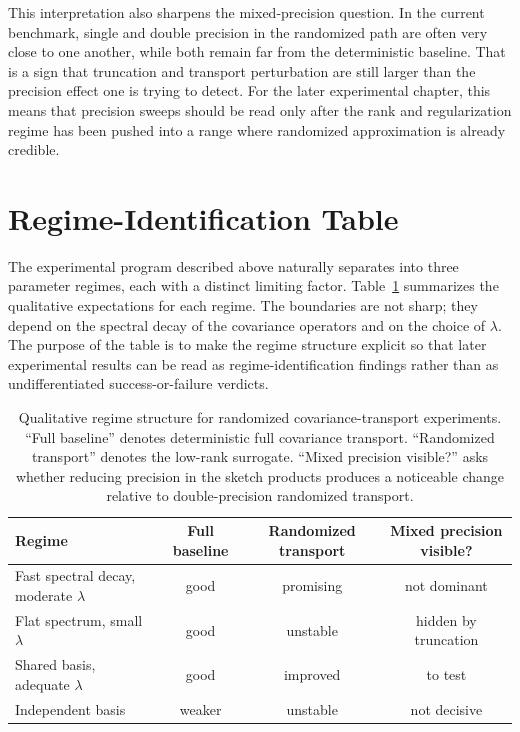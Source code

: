 This interpretation also sharpens the mixed-precision question. In the current
benchmark, single and double precision in the randomized path are often very close
to one another, while both remain far from the deterministic baseline. That is a
sign that truncation and transport perturbation are still larger than the precision
effect one is trying to detect. For the later experimental chapter, this means that
precision sweeps should be read only after the rank and regularization regime has
been pushed into a range where randomized approximation is already credible.

\section{Regime-Identification Table}

The experimental program described above naturally separates into three parameter
regimes, each with a distinct limiting factor.  Table~\ref{tab:regimes}
summarizes the qualitative expectations for each regime.  The boundaries are not
sharp; they depend on the spectral decay of the covariance operators and on the
choice of \(\lambda\).  The purpose of the table is to make the regime structure
explicit so that later experimental results can be read as regime-identification
findings rather than as undifferentiated success-or-failure verdicts.

\begin{table}[t]
	\centering
	\caption{Qualitative regime structure for randomized covariance-transport
		experiments.  ``Full baseline'' denotes deterministic full covariance transport.
		``Randomized transport'' denotes the low-rank surrogate.  ``Mixed precision
		visible?'' asks whether reducing precision in the sketch products produces a
		noticeable change relative to double-precision randomized transport.}
	\label{tab:regimes}
	\begin{tabular}{lccc}
		\toprule
		Regime                                    & Full baseline & Randomized transport & Mixed precision visible? \\
		\midrule
		Fast spectral decay, moderate \(\lambda\) & good          & promising            & not dominant             \\
		Flat spectrum, small \(\lambda\)          & good          & unstable             & hidden by truncation     \\
		Shared basis, adequate \(\lambda\)        & good          & improved             & to test                  \\
		Independent basis                         & weaker        & unstable             & not decisive             \\
		\bottomrule
	\end{tabular}
\end{table}

